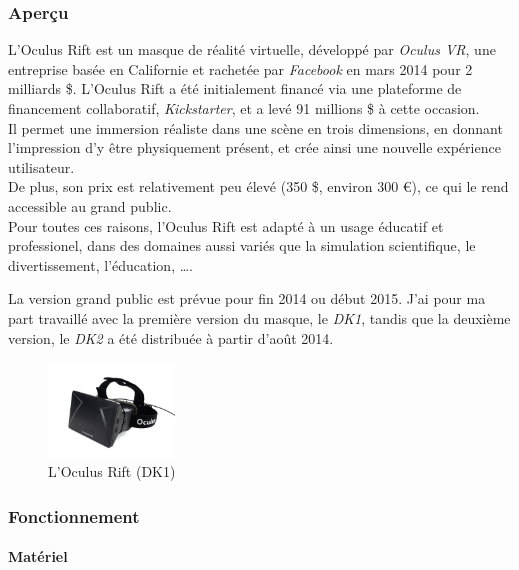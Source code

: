 \documentclass[a4paper,french,12pt]{article}
\begin{document}
		\subsubsection{Aperçu}
		  L'Oculus Rift est un masque de réalité virtuelle, développé par \emph{Oculus VR}, une entreprise 
		  basée en Californie et rachetée par \emph{Facebook} en mars 2014 pour  2 milliards \$.
		  L'Oculus Rift a été initialement financé via une plateforme de financement collaboratif, \emph{Kickstarter},
		  et a levé 91 millions \$ à cette occasion. \\
		  Il permet une immersion  réaliste dans une scène en trois dimensions, en donnant l'impression d'y être physiquement
		  présent, et crée ainsi une nouvelle expérience
		  utilisateur. \\
		  De plus, son prix est relativement peu élevé (350 \$, environ 300 \euro), ce qui le rend accessible au grand public. \\
		  Pour toutes ces raisons, l'Oculus Rift est adapté à un usage éducatif et professionel, dans des domaines aussi variés
		  que la simulation scientifique, le divertissement, l'éducation, \ldots.
		  
		  La version grand public est prévue pour fin 2014 ou début 2015. J'ai pour ma part travaillé avec la première
		  version du masque, le \emph{DK1}, tandis que la deuxième version, le \emph{DK2} a été distribuée à partir d'août 2014.
		  
		  \begin{figure}[h!]
		    \centering
		      \includegraphics[width=0.3\textwidth]{dk1.jpg}
		    \caption{L'Oculus Rift (DK1)}
		  \end{figure}
		  
		  \subsubsection{Fonctionnement}
		  
			\paragraph{Matériel} ~\\
		    
\end{document}
